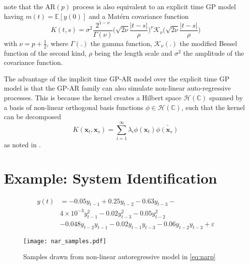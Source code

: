 \cite{roberts2013gaussian} note that the $\mathrm{AR}(p)$ process is also equivalent to an explicit time GP model 
having $m(t) = \mathbb{E}[y(0)]$ and a Mat\'{e}rn covariance function
%
\begin{equation*}
    K(t, s)=\sigma ^{2}{\frac {2^{1-\nu }}{\Gamma (\nu )}}
    {\Bigg (}
        {\sqrt {2\nu }}{\frac {\rvert t - s \rvert}{\rho }}
    {\Bigg )}^{\nu }\mathcal{K}_{\nu }{\Bigg (}{\sqrt {2\nu }}{\frac {\rvert t - s \rvert}{\rho }}{\Bigg )}
\end{equation*}
%
with $\nu = p + \frac{1}{2}$, where $\Gamma(.)$ the gamma function, $\mathcal{K}_{\nu }(.)$ the modified 
Bessel function of the second kind, $\rho$ being the length scale and $\sigma^2$ the amplitude of the 
covariance function.

The advantage of the implicit time GP-AR model over the explicit time GP model is that the GP-AR family 
can also simulate non-linear auto-regressive processes. This is because the kernel creates a Hilbert space 
$\mathcal{H}(\mathbb{C})$ spanned by a basis of non-linear orthogonal basis functions 
$\phi \in \mathcal{H}(\mathbb{C})$, such that the kernel can be decomposed  
%
\begin{equation*}
    K(\mathbf{x}_t, \mathbf{x}_s) = \sum^{\infty}_{i = 1}{\lambda_{i}\phi(\mathbf{x}_t) \bar{\phi(\mathbf{x}_s)}}
\end{equation*}
%
as noted in \citet[sec.~4.3]{Rasmussen:2005:GPM:1162254}.



\section*{Example: System Identification}


\begin{equation}\label{eq:narp}
    \begin{aligned}
        y(t) &= -0.05 y_{t-1} + 0.25 y_{t-2} - 0.63 y_{t-3} - \\
        & 4\times10^{-3} y^2_{t-1} - 0.02 y^{2}_{t-3} - 0.05 y^{2}_{t-2} \\ 
        & - 0.048 y_{t-2} y_{t-1} - 0.02 y_{t-1} y_{t-3} - 0.06 y_{t-2} y_{t-3} + \varepsilon
    \end{aligned}
\end{equation}


\begin{figure}
    \centering
    \noindent\texttt{[image: nar\_samples.pdf]}
    \caption{Samples drawn from non-linear autoregressive model in \cref{eq:narp}}
    \label{fig:narpSamples}
\end{figure}




